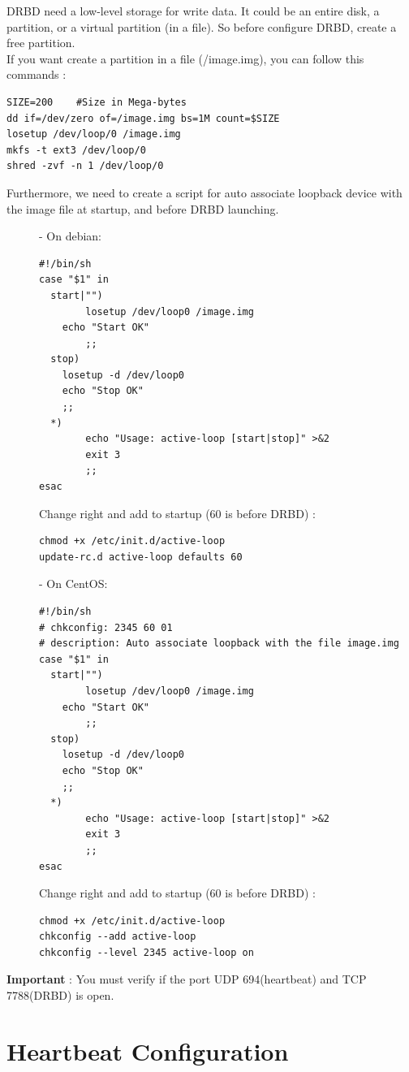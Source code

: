 \documentclass[a4paper,10pt]{report}
\begin{document}
DRBD need a low-level storage for write data. It could be an entire disk, a partition, or a virtual partition (in a file). So before configure DRBD, create a free partition.\\
If you want create a partition in a file (/image.img), you can follow this commands :
\begin{lstlisting}
SIZE=200	#Size in Mega-bytes
dd if=/dev/zero of=/image.img bs=1M count=$SIZE
losetup /dev/loop/0 /image.img
mkfs -t ext3 /dev/loop/0
shred -zvf -n 1 /dev/loop/0	
\end{lstlisting}
Furthermore, we need to create a script for auto associate loopback device with the image file at startup, and before DRBD launching.
\begin{description}
\item[]- On debian:
\begin{lstlisting}
#!/bin/sh
case "$1" in
  start|"") 
        losetup /dev/loop0 /image.img
	echo "Start OK"
        ;;
  stop)
	losetup -d /dev/loop0
	echo "Stop OK"
	;;
  *)
        echo "Usage: active-loop [start|stop]" >&2
        exit 3
        ;;
esac
\end{lstlisting}
Change right and add to startup (60 is before DRBD) :
\begin{lstlisting}
chmod +x /etc/init.d/active-loop
update-rc.d active-loop defaults 60
\end{lstlisting}

\item[]- On CentOS:
\begin{lstlisting}
#!/bin/sh
# chkconfig: 2345 60 01
# description: Auto associate loopback with the file image.img
case "$1" in
  start|"") 
        losetup /dev/loop0 /image.img
	echo "Start OK"
        ;;
  stop)
	losetup -d /dev/loop0
	echo "Stop OK"
	;;
  *)
        echo "Usage: active-loop [start|stop]" >&2
        exit 3
        ;;
esac
\end{lstlisting}
Change right and add to startup (60 is before DRBD) :
\begin{lstlisting}
chmod +x /etc/init.d/active-loop
chkconfig --add active-loop
chkconfig --level 2345 active-loop on
\end{lstlisting}
\end{description}

\textbf{Important} : You must verify if the port UDP 694(heartbeat) and TCP 7788(DRBD) is open.

\section{Heartbeat Configuration}
\end{document}
